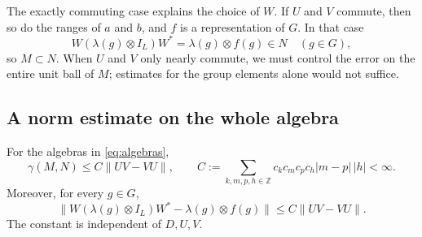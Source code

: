 The exactly commuting case explains the choice of $W$. If $U$ and $V$
commute, then so do the ranges of $a$ and $b$, and $f$ is a
representation of $G$. In that case
\[
 W(\lambda(g)\otimes I_L)W^*=\lambda(g)\otimes f(g)\in N
 \quad(g\in G),
\]
so $M\subset N$. When $U$ and $V$ only nearly commute, we must
control the error on the entire unit ball of $M$; estimates for the
group elements alone would not suffice.

\subsection{A norm estimate on the whole algebra}
\begin{proposition}\label{prop:near}
For the algebras in \eqref{eq:algebras},
\begin{equation}\label{eq:near-bound}
 \gamma(M,N)\leq C\|UV-VU\|,
 \qquad
 C:=\sum_{k,m,p,h\in\mathbb Z}
       c_kc_mc_pc_h|m-p|\,|h|<\infty.
\end{equation}
Moreover, for every $g\in G$,
\begin{equation}\label{eq:group-bound}
 \bigl\|W(\lambda(g)\otimes I_L)W^*
            -\lambda(g)\otimes f(g)\bigr\|
 \leq C\|UV-VU\|.
\end{equation}
The constant is independent of $D,U,V$.
\end{proposition}

